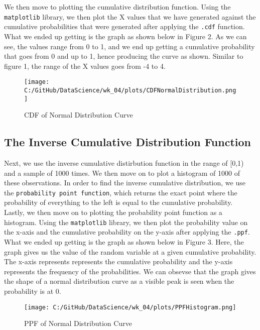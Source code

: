 \documentclass[a4paper,twocolumn]{article}
\begin{document}
We then move to plotting the cumulative distribution function. Using the \texttt{matplotlib} library, we then plot the 
X values that we have generated against the cumulative probabilities that were generated after applying the 
\texttt{.cdf} function. \\

What we ended up getting is the graph as shown below in Figure 2. As we can see, the values range from 0 to 1, 
and we end up getting a cumulative probability that goes from 0 and up to 1, hence producing the curve as shown.
Similar to figure 1, the range of the X values goes from -4 to 4.


\begin{figure}[htbp] 
    \centering
    \noindent
    \texttt{[image: C:/GitHub/DataScience/wk\_04/plots/CDFNormalDistribution.png]}
    \caption{CDF of Normal Distribution Curve} 
\end{figure}

\subsection{The Inverse Cumulative Distribution Function}
Next, we use the inverse cumulative distirbution function in the range of [0,1) and a sample of 1000 times. 
We then move on to plot a histogram of 1000 of these observations.  In order to find the inverse cumulative 
distribution, we use the \texttt{probability point function}, which returns the exact point where the probability of 
everything to the left is equal to the cumulative probability. \\

Lastly, we then move on to plotting the probability point function as a histogram. Using the 
\texttt{matplotlib} library, we then plot the probability value on the x-axis and the cumulative probability on 
the y-axis after applying the \texttt{.ppf}. \\

What we ended up getting is the graph as shown below in Figure 3. Here, the graph gives us the value of the 
random variable at a given cumulative probability. The x-axis represents represents the cumulative probability
and the y-axis represents the frequency of the probabilities. We can obsevse that the graph gives the shape of a
normal distribution curve as a visible peak is seen when the probability is at 0.

\begin{figure}[htbp] 
    \centering
    \noindent
    \texttt{[image: C:/GitHub/DataScience/wk\_04/plots/PPFHistogram.png]}
    \caption{PPF of Normal Distribution Curve} 
\end{figure}
\end{document}
